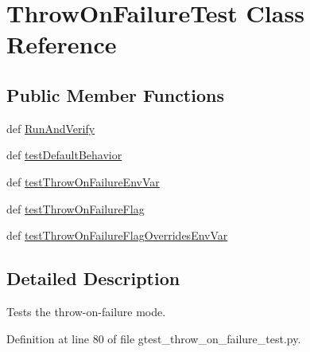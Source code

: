 \hypertarget{classgtest__throw__on__failure__test_1_1ThrowOnFailureTest}{\section{\-Throw\-On\-Failure\-Test \-Class \-Reference}
\label{de/dec/classgtest__throw__on__failure__test_1_1ThrowOnFailureTest}
}
\subsection*{\-Public \-Member \-Functions}
\begin{DoxyCompactItemize}
\item 
def \hyperlink{classgtest__throw__on__failure__test_1_1ThrowOnFailureTest_adc02f4ab231c886fc73ece7b7ee533c1}{\-Run\-And\-Verify}
\item 
def \hyperlink{classgtest__throw__on__failure__test_1_1ThrowOnFailureTest_a9da84d75ab4797f2c3730d5974ed3823}{test\-Default\-Behavior}
\item 
def \hyperlink{classgtest__throw__on__failure__test_1_1ThrowOnFailureTest_a5509d0a7a0e3f469105c907cfa7e9770}{test\-Throw\-On\-Failure\-Env\-Var}
\item 
def \hyperlink{classgtest__throw__on__failure__test_1_1ThrowOnFailureTest_a66ec8a0b0bac9fc0a70dc5e4bc3a94e3}{test\-Throw\-On\-Failure\-Flag}
\item 
def \hyperlink{classgtest__throw__on__failure__test_1_1ThrowOnFailureTest_a79f6236e5ecece421f3cd62c906c1758}{test\-Throw\-On\-Failure\-Flag\-Overrides\-Env\-Var}
\end{DoxyCompactItemize}


\subsection{\-Detailed \-Description}
\begin{DoxyVerb}Tests the throw-on-failure mode.\end{DoxyVerb}
 

\-Definition at line 80 of file gtest\-\_\-throw\-\_\-on\-\_\-failure\-\_\-test.\-py.



